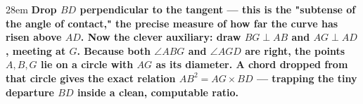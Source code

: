 \documentclass[border=4pt]{standalone}
\begin{document}
\begin{varwidth}{28em}
\large\bfseries
Drop $BD$ perpendicular to the tangent — this is the "subtense of the      angle of contact," the precise measure of how far the curve has risen      above $AD$. Now the clever auxiliary: draw $BG\perp AB$ and $AG\perp AD$,      meeting at $G$. Because both $\angle ABG$ and $\angle AGD$ are right, the points      $A,B,G$ lie on a circle with $AG$ as its diameter. A chord dropped      from that circle gives the exact relation $AB^{2}=AG\times BD$ — trapping the tiny      departure $BD$ inside a clean, computable ratio.
\end{varwidth}
\end{document}
